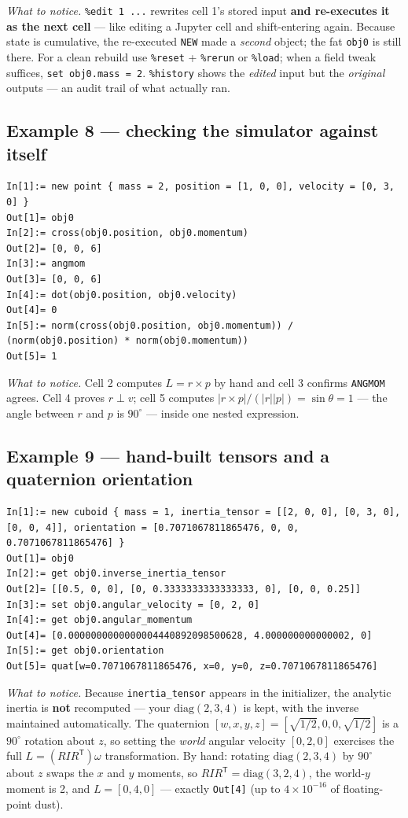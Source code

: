 \documentclass[11pt]{article}
\newcommand{\kw}[1]{\texttt{\uppercase{#1}}}
\newcommand{\code}[1]{\texttt{#1}}
\begin{document}
\emph{What to notice.} \code{\%edit 1 ...} rewrites cell 1's stored
input \textbf{and re-executes it as the next cell} --- like editing a
Jupyter cell and shift-entering again. Because state is cumulative, the
re-executed \kw{new} made a \emph{second} object; the fat \code{obj0} is
still there. For a clean rebuild use \code{\%reset} + \code{\%rerun} or
\code{\%load}; when a field tweak suffices, \code{set obj0.mass = 2}.
\code{\%history} shows the \emph{edited} input but the \emph{original}
outputs --- an audit trail of what actually ran.

\subsection{Example 8 --- checking the simulator against itself}

\begin{lstlisting}
In[1]:= new point { mass = 2, position = [1, 0, 0], velocity = [0, 3, 0] }
Out[1]= obj0
In[2]:= cross(obj0.position, obj0.momentum)
Out[2]= [0, 0, 6]
In[3]:= angmom
Out[3]= [0, 0, 6]
In[4]:= dot(obj0.position, obj0.velocity)
Out[4]= 0
In[5]:= norm(cross(obj0.position, obj0.momentum)) / (norm(obj0.position) * norm(obj0.momentum))
Out[5]= 1
\end{lstlisting}

\emph{What to notice.} Cell 2 computes $L = r\times p$ by hand and cell
3 confirms \kw{angmom} agrees. Cell 4 proves $r\perp v$; cell 5 computes
$|r\times p|/(|r||p|) = \sin\theta = 1$ --- the angle between $r$ and
$p$ is $90^\circ$ --- inside one nested expression.

\subsection{Example 9 --- hand-built tensors and a quaternion orientation}

\begin{lstlisting}
In[1]:= new cuboid { mass = 1, inertia_tensor = [[2, 0, 0], [0, 3, 0], [0, 0, 4]], orientation = [0.7071067811865476, 0, 0, 0.7071067811865476] }
Out[1]= obj0
In[2]:= get obj0.inverse_inertia_tensor
Out[2]= [[0.5, 0, 0], [0, 0.3333333333333333, 0], [0, 0, 0.25]]
In[3]:= set obj0.angular_velocity = [0, 2, 0]
In[4]:= get obj0.angular_momentum
Out[4]= [0.0000000000000004440892098500628, 4.000000000000002, 0]
In[5]:= get obj0.orientation
Out[5]= quat[w=0.7071067811865476, x=0, y=0, z=0.7071067811865476]
\end{lstlisting}

\emph{What to notice.} Because \code{inertia\_tensor} appears in the
initializer, the analytic inertia is \textbf{not} recomputed --- your
$\mathrm{diag}(2,3,4)$ is kept, with the inverse maintained
automatically. The quaternion $[w,x,y,z] = [\sqrt{1/2},0,0,\sqrt{1/2}]$
is a $90^\circ$ rotation about $z$, so setting the \emph{world} angular
velocity $[0,2,0]$ exercises the full $L = (R I R^{\mathsf T})\omega$
transformation. By hand: rotating $\mathrm{diag}(2,3,4)$ by $90^\circ$
about $z$ swaps the $x$ and $y$ moments, so
$R I R^{\mathsf T} = \mathrm{diag}(3,2,4)$, the world-$y$ moment is 2,
and $L = [0, 4, 0]$ --- exactly \code{Out[4]} (up to $4\times10^{-16}$
of floating-point dust).
\end{document}
